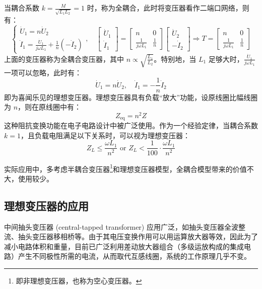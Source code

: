 \documentclass[UTF8]{report}
\theoremstyle{MyLineTheoremStyle} %
\theoremstyle{MyBlockTheoremStyle} %
\theoremstyle{MySubsubsectionStyle} %
\begin{document}
当耦合系数 $k = \frac{M}{\sqrt{L_1 L_2}} = 1$ 时，称为全耦合，此时将变压器看作二端口网络，则有：
\begin{equation}
\begin{cases}
\dot{U}_1 = n \dot{U}_2 \\ 
\dot{I}_1 = \frac{\dot{U}_1}{j \omega L_1} + \frac{1}{n} (- \dot{I}_2)
\end{cases}
,\quad 
\begin{bmatrix}
    \dot{U}_1 \\ \dot{I}_1 
\end{bmatrix}
= 
\begin{bmatrix}
    n & 0 \\ 
    \frac{1}{j \omega L_1} & \frac{1}{n} 
\end{bmatrix}
\begin{bmatrix}
    \dot{U}_2 \\ 
    - \dot{I}_2
\end{bmatrix}
\Longrightarrow 
T = 
\begin{bmatrix}
    n & 0 \\ 
    \frac{1}{j \omega L_1} & \frac{1}{n} 
\end{bmatrix}
\end{equation}
上面的变压器称为全耦合变压器，其中 $n \propto \sqrt{\frac{L_1}{L_2}}$。特别地，当 $L_1$ 足够大时，$\frac{\dot{U}_1}{j\omega L_1}$ 一项可以忽略，此时有：
\begin{equation}
    \dot{U}_1 = n \dot{U}_2,\quad \dot{I}_1 =  - \frac{1}{n} \dot{I}_2
\end{equation}
即为喜闻乐见的理想变压器。理想变压器具有负载“放大”功能，设原线圈比幅线圈为 $n$，则在原线圈中有：
\begin{equation}
Z_{\text{eq}} = n^{2} Z
\end{equation}
这种阻抗变换功能在电子电路设计中被广泛使用。作为一个经验定律，当耦合系数 $k = 1$，且负载电阻满足以下关系时，可以视为理想变压器：
\begin{equation}
Z_L \leqslant \frac{\omega L_1}{n^2} \text{\ \ or \ \ } Z_L < \frac{1}{100} \cdot \frac{\omega L_1}{n^2}
\end{equation}


实际应用中，多考虑半耦合变压器\footnote{即非理想变压器，也称为空心变压器。}和理想变压器模型，全耦合模型带来的价值不大，使用较少。


\subsection{理想变压器的应用}
中间抽头变压器 (central-tapped transformer) 应用广泛，如抽头变压器全波整流、抽头变压器移相桥等。由于其电压变换作用可以用运算放大器等效，因此为了减小电路体积和重量，目前已广泛利用差动放大器组合（多级运放构成的集成电路）产生不同极性所需的电流，从而取代互感线圈，系统的工作原理几乎不变。
\end{document}
